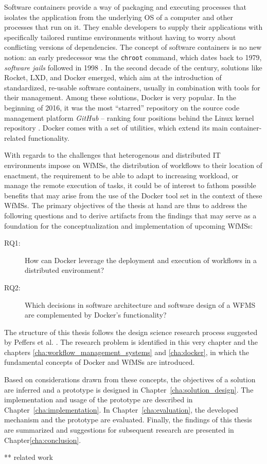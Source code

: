 
Software containers provide a way of packaging and executing processes that isolates the application from the underlying \ac{OS} of a computer and other processes that run on it. They enable developers to supply their applications with specifically tailored runtime environments without having to worry about conflicting versions of dependencies. \cite{}
The concept of software containers is no new notion: an early predecessor was the \texttt{chroot} command, which dates back to 1979, \emph{software jails} followed in 1998 \cite{Bernstein2014Containers}.
In the second decade of the  century, solutions like Rocket, LXD, and Docker emerged, which aim at the introduction of standardized, re-usable software containers, usually in combination with tools for their management. Among these solutions, Docker is very popular. In the beginning of 2016, it was the  most ``starred'' repository on the source code management platform \emph{GitHub} -- ranking four positions behind the Linux kernel repository \cite{Github2016Repositories}. Docker comes with a set of utilities, which extend its main container-related functionality.

With regards to the challenges that heterogenous and distributed \ac{IT} environments impose on \acp{WfMS}, \eg the distribution of workflows to their location of enactment, the requirement to be able to adapt to increasing workload, or manage the remote execution of tasks, it could be of interest to fathom possible benefits that may arise from the use of the Docker tool set in the context of these \acp{WfMS}. The primary objectives of the thesis at hand are thus to address the following questions and to derive artifacts from the findings that may serve as a foundation for the conceptualization and implementation of upcoming \acp{WfMS}:

\begin{description}
  \item[RQ1:] How can Docker leverage the deployment and execution of workflows in a distributed environment?
  \item[RQ2:] Which decisions in software architecture and software design of a WFMS are complemented by Docker's functionality?
\end{description}

The structure of this thesis follows the design science research process suggested by Peffers et al. \cite[pp.~89-92]{Peffers2007Design}. The research problem is identified in this very chapter and the chapters \ref{cha:workflow_management_systems} and \ref{cha:docker}, in which the fundamental concepts of Docker and \acp{WfMS} are introduced.

Based on considerations drawn from these concepts, the objectives of a solution are inferred and a prototype is designed in Chapter~\ref{cha:solution_design}. The implementation and usage of the prototype are described in Chapter~\ref{cha:implementation}. In Chapter~\ref{cha:evaluation}, the developed mechanism and the prototype are evaluated. Finally, the findings of this thesis are summarized and suggestions for subsequent research are presented in Chapter\ref{cha:conclusion}.

** related work
